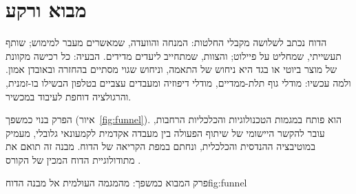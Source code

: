\chapter{מבוא ורקע}
\label{ch:intro}

\begin{managerbox}
הדוח נכתב לשלושה מקבלי החלטות: המנחה והוועדה, שמאשרים מעבר למימוש; שותף תעשייתי, שמחליט על פיילוט; והצוות, שמתחייב ליעדים מדידים. הבעיה: כל רכישה מקוונת של מוצר ביוטי או בגד היא ניחוש של התאמה, וניחוש שגוי מסתיים בהחזרה ובאובדן אמון. ולמה עכשיו: מודלי גוף תלת-ממדיים, מודלי דיפוזיה ומעבדים עצביים בטלפון הבשילו בו-זמנית, והרגולציה דוחפת לעיבוד במכשיר.
\end{managerbox}

הפרק בנוי כמשפך (איור~\ref{fig:funnel}). הוא פותח במגמות הטכנולוגיות והכלכליות הרחבות, עובר להקשר היישומי של שיתוף הפעולה בין מעבדה אקדמית לקמעונאי גלובלי, מעמיק במוטיבציה ההנדסית והכלכלית, ונחתם במפת הקריאה של הדוח. מבנה זה תואם את מתודולוגיית הדוח המכין של הקורס \cite{segal2026booklet}.

\begin{reportfigure}{פרק המבוא כמשפך: מהמגמה העולמית אל מבנה הדוח}{fig:funnel}
\end{reportfigure}

